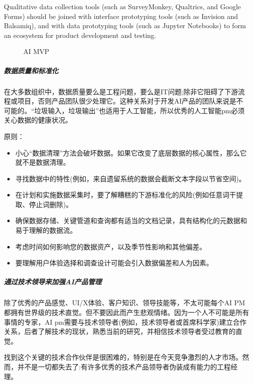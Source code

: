 \documentclass[letterpaper,10pt,english]{sphinxmanual}
\begin{document}
Qualitative data collection tools (such as SurveyMonkey, Qualtrics, and
Google Forms) should be joined with interface prototyping tools (such as
Invision and Balsamiq), and with data prototyping tools (such as Jupyter
Notebooks) to form an ecosystem for product development and testing.

\begin{figure}[H]
\centering
\capstart

\noindent{}
\caption{AI MVP}\label{\detokenize{chapter_project/process:id37}}\end{figure}


\subparagraph{数据质量和标准化}
\label{\detokenize{chapter_project/process:id24}}
在大多数组织中，数据质量要么是工程问题，要么是IT问题;除非它阻碍了下游流程或项目，否则产品团队很少处理它。这种关系对于开发AI产品的团队来说是不可能的。“垃圾输入，垃圾输出”也适用于人工智能，所以优秀的人工智能pm必须关心数据的健康状况。

原则：
\begin{itemize}
\item {} 
小心“数据清理”方法会破坏数据。如果它改变了底层数据的核心属性，那么它就不是数据清理。

\item {} 
寻找数据中的特性(例如，来自遗留系统的数据会截断文本字段以节省空间)。

\item {} 
在计划和实施数据采集时，要了解糟糕的下游标准化的风险(例如任意词干提取、停止词删除)。

\item {} 
确保数据存储、关键管道和查询都有适当的文档记录，具有结构化的元数据和易于理解的数据流。

\item {} 
考虑时间如何影响您的数据资产，以及季节性影响和其他偏差。

\item {} 
要理解用户体验选择和调查设计可能会引入数据偏差和人为因素。

\end{itemize}


\subparagraph{通过技术领导来加强AI产品管理}
\label{\detokenize{chapter_project/process:id25}}
除了优秀的产品感觉、UI/X体验、客户知识、领导技能等，不太可能每个AI
PM都拥有世界级的技术直觉。但不要因此而产生悲观情绪。因为一个人不可能是所有事情的专家，AI
pm需要与技术领导者(例如，技术领导者或首席科学家)建立合作关系，后者了解技术的现状，熟悉当前的研究，并相信技术领导者受过教育的直觉。

找到这个关键的技术合作伙伴是很困难的，特别是在今天竞争激烈的人才市场。然而，并不是一切都失去了:有许多优秀的技术产品领导者伪装成有能力的工程经理。
\end{document}
